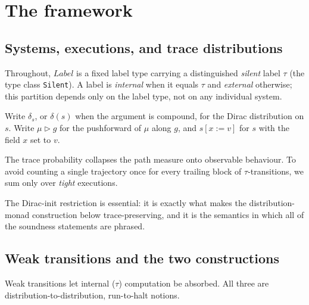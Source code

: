 
\chapter{The framework}

\section{Systems, executions, and trace distributions}

Throughout, $Label$ is a fixed label type carrying a distinguished \emph{silent} label $\tau$ (the type class \texttt{Silent}).
A label is \emph{internal} when it equals $\tau$ and \emph{external} otherwise; this partition depends only on the label type, not on any individual system.

Write $\delta_s$, or $\delta(s)$ when the argument is compound, for the Dirac distribution on $s$.
Write $\mu \triangleright g$ for the pushforward of $\mu$ along $g$, and $s[x := v]$ for $s$ with the field $x$ set to $v$.









The trace probability collapses the path measure onto observable behaviour.
To avoid counting a single trajectory once for every trailing block of $\tau$-transitions, we sum only over \emph{tight} executions.







The Dirac-init restriction is essential: it is exactly what makes the distribution-monad construction below trace-preserving, and it is the semantics in which all of the soundness statements are phrased.

\section{Weak transitions and the two constructions}

Weak transitions let internal ($\tau$) computation be absorbed.
All three are distribution-to-distribution, run-to-halt notions.

